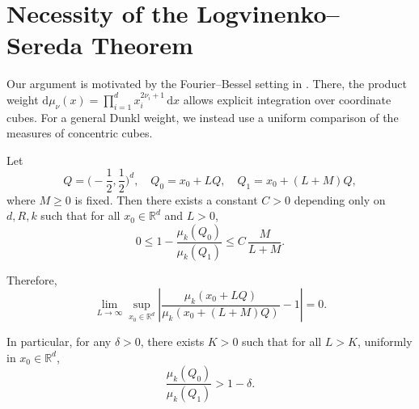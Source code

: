\documentclass[12pt]{article}
\begin{document}
\section{Necessity of the Logvinenko--Sereda Theorem}
\label{sec:necessity}
 
Our argument is motivated by the Fourier--Bessel setting in \cite{HX}. There, the product weight $\mathrm{d}\mu_\nu(x)=\prod_{i=1}^d x_i^{2\nu_i+1}\,\mathrm{d}x$ allows explicit integration over coordinate cubes. For a general Dunkl weight, we instead use a uniform comparison of the measures of concentric cubes.

\begin{lemma}\label{L4001}
Let
\[
Q=\biggl(-\frac12,\frac12\biggr)^d,\quad Q_0=x_0+LQ,\quad Q_1=x_0+(L+M)Q,
\]
where $M\ge 0$ is fixed. Then there exists a constant $C>0$ depending only on $d,R,k$ such that for all $x_0\in\mathbb{R}^d$ and $L>0$,
\begin{equation}\label{E4001}
0\le 1-\frac{\mu_k(Q_0)}{\mu_k(Q_1)}\le C\,\frac{M}{L+M}.
\end{equation}

Therefore,
\begin{equation}\label{E4002}
\lim_{L\to\infty}\sup_{x_0\in\mathbb{R}^d}\left|\frac{\mu_k(x_0+LQ)}{\mu_k(x_0+(L+M)Q)}-1\right|=0.
\end{equation}

In particular, for any $\delta>0$, there exists $K>0$ such that for all $L>K$, uniformly in $x_0\in\mathbb{R}^d$,
\[
\frac{\mu_k(Q_0)}{\mu_k(Q_1)}>1-\delta.
\]

\end{lemma}
\end{document}
